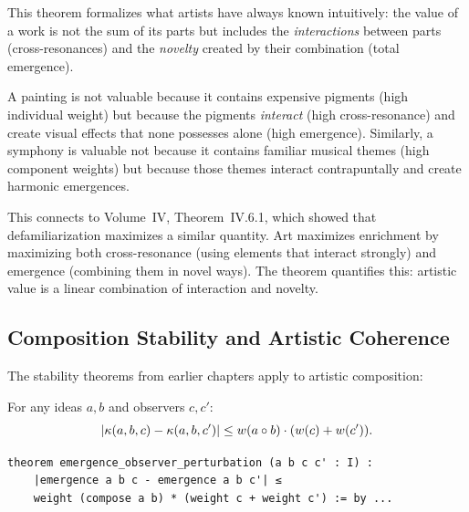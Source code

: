 \begin{interpretation}
This theorem formalizes what artists have always known intuitively: the value
of a work is not the sum of its parts but includes the \emph{interactions}
between parts (cross-resonances) and the \emph{novelty} created by their
combination (total emergence).

A painting is not valuable because it contains expensive pigments (high
individual weight) but because the pigments \emph{interact} (high cross-resonance)
and create visual effects that none possesses alone (high emergence). Similarly,
a symphony is valuable not because it contains familiar musical themes (high
component weights) but because those themes interact contrapuntally and create
harmonic emergences.

This connects to Volume~IV, Theorem~IV.6.1, which showed that defamiliarization
maximizes a similar quantity. Art maximizes enrichment by maximizing both
cross-resonance (using elements that interact strongly) and emergence (combining
them in novel ways). The theorem quantifies this: artistic value is a linear
combination of interaction and novelty.
\end{interpretation}

\subsection{Composition Stability and Artistic Coherence}

The stability theorems from earlier chapters apply to artistic composition:

\begin{theorem}
\label{thm:emergence-observer-perturbation}
For any ideas $a, b$ and observers $c, c'$:
\[
  |\kappa(a, b, c) - \kappa(a, b, c')| \leq
  w(a \circ b) \cdot (w(c) + w(c')).
\]
\end{theorem}

\begin{lstlisting}[caption={Observer perturbation bound (IDT\_v3\_Emergence.lean)}]
theorem emergence_observer_perturbation (a b c c' : I) :
    |emergence a b c - emergence a b c'| ≤
    weight (compose a b) * (weight c + weight c') := by ...
\end{lstlisting}

